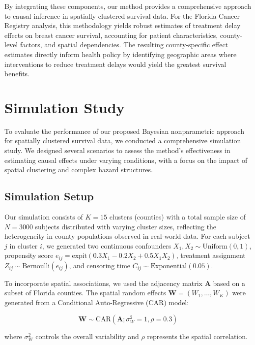 \documentclass[useAMS,referee]{biom}
\begin{document}
By integrating these components, our method provides a comprehensive approach to causal inference in spatially clustered survival data. For the Florida Cancer Registry analysis, this methodology yields robust estimates of treatment delay effects on breast cancer survival, accounting for patient characteristics, county-level factors, and spatial dependencies. The resulting county-specific effect estimates directly inform health policy by identifying geographic areas where interventions to reduce treatment delays would yield the greatest survival benefits.

\section{Simulation Study}

To evaluate the performance of our proposed Bayesian nonparametric approach for spatially clustered survival data, we conducted a comprehensive simulation study. We designed several scenarios to assess the method's effectiveness in estimating causal effects under varying conditions, with a focus on the impact of spatial clustering and complex hazard structures.

\subsection{Simulation Setup}

Our simulation consists of $K = 15$ clusters (counties) with a total sample size of $N = 3000$ subjects distributed with varying cluster sizes, reflecting the heterogeneity in county populations observed in real-world data. For each subject $j$ in cluster $i$, we generated two continuous confounders $X_1, X_2 \sim \text{Uniform}(0, 1)$, propensity score $e_{ij} = \text{expit}(0.3X_1 - 0.2X_2 + 0.5X_1X_2)$, treatment assignment $Z_{ij} \sim \text{Bernoulli}(e_{ij})$, and censoring time $C_{ij} \sim \text{Exponential}(0.05)$.

To incorporate spatial associations, we used the adjacency matrix $\mathbf{A}$ based on a subset of Florida counties. The spatial random effects $\mathbf{W} = (W_1, \ldots, W_K)$ were generated from a Conditional Auto-Regressive (CAR) model:

\begin{equation}
\mathbf{W} \sim \text{CAR}(\mathbf{A}; \sigma_W^2 = 1, \rho = 0.3)
\end{equation}

where $\sigma_W^2$ controls the overall variability and $\rho$ represents the spatial correlation. 
\end{document}
